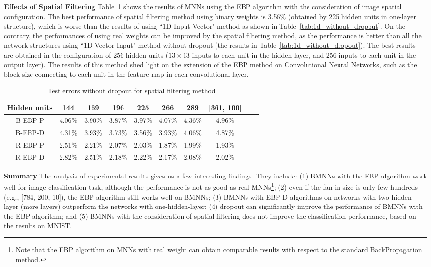 \documentclass{article} %
\begin{document}
\textbf{Effects of Spatial Filtering} Table~\ref{tab:2d_without_dropout} shows the results of MNNs using the EBP algorithm with the consideration of image spatial configuration. The best performance of spatial filtering method using binary weights is 3.56\% (obtained by 225 hidden units in one-layer structure), which is worse than the results of using ``1D Input Vector" method as shown in Table~\ref{tab:1d_without_dropout}. On the contrary, the performances of using real weights can be improved by the spatial filtering method, as the performance is better than all the network structures using ``1D Vector Input" method without dropout (the results in Table~\ref{tab:1d_without_dropout}). The best results are obtained in the configuration of 256 hidden units ($13 \times 13$ inputs to each unit in the hidden layer, and 256 inputs to each unit in the output layer). The results of this method shed light on the extension of the EBP method on Convolutional Neural Networks, such as the block size connecting to each unit in the feature map in each convolutional layer.
\begin{table}
\centering
\caption{Test errors without dropout for spatial filtering method}
\begin{tabular}{|c||c|c|c|c|c|c|c|c||c|} \hline
Hidden units	&	144	&	169	&	196	&	225	&	266	&	289	&	[361, 100]	\\ \hline \hline
B-EBP-P	&	4.06\%	&	3.90\%	&	3.87\%	&	3.97\%	&	4.07\%	&	4.36\%	&	4.96\%	\\ \hline
B-EBP-D	&	4.31\%	&	3.93\%	&	3.73\%	&	3.56\%	&	3.93\%	&	4.06\%	&	4.87\%	\\ \hline \hline
R-EBP-P	&	2.51\%	&	2.21\%	&	2.07\%	&	2.03\%	&	1.87\%	&	1.99\%	&	1.93\%	\\ \hline
R-EBP-D	&	2.82\%	&	2.51\%	&	2.18\%	&	2.22\%	&	2.17\%	&	2.08\%	&	2.02\%	\\ \hline

\end{tabular}
 \label{tab:2d_without_dropout}
\end{table}

\textbf{Summary} The analysis of experimental results gives us a few interesting findings. They include: (1) BMNNs with the EBP algorithm work well for image classification task, although the performance is not as good as real MNNs\footnote{Note that the EBP algorithm on MNNs with real weight can obtain comparable results with respect to the standard BackPropagation method.}; (2) even if the fan-in size is only few hundreds (e.g., [784, 200, 10]), the EBP algorithm still works well on BMNNs; (3) BMNNs with EBP-D algorithms on networks with two-hidden-layer (more layers) outperform the networks with one-hidden-layer; (4) dropout can significantly improve the performance of BMNNs with the EBP algorithm; and (5) BMNNs with the consideration of spatial filtering does not improve the classification performance, based on the results on MNIST.
\end{document}
